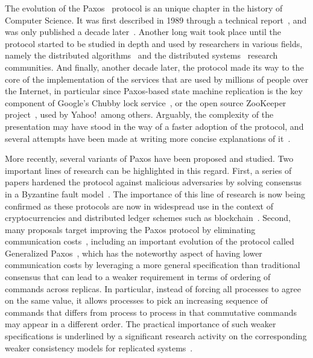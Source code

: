 The evolution of the Paxos~\cite{Lam98} protocol is an unique
chapter in the history of Computer Science. It was first described in
1989 through a technical report~\cite{paxos:tr}, and was only
published a decade later~\cite{Lam98}. Another long wait took
place until the protocol started to be studied in depth and used by
researchers in various fields, namely the distributed
algorithms~\cite{DPLL97} and the distributed systems~\cite{petal}
research communities. And finally, another decade later, the protocol
made its way to the core of the implementation of the services that
are used by millions of people over the Internet, in particular since
Paxos-based state machine replication is the key component of Google's
Chubby lock service~\cite{chubby}, or the open source ZooKeeper
project~\cite{zookeeper}, used by Yahoo!\ among others. Arguably, the
complexity of the presentation may have stood in the way of a faster
adoption of the protocol, and several attempts have been made at
writing more concise explanations of
it~\cite{L01,Renesse2011}.


More recently, several variants of Paxos have been proposed and
studied. Two important lines of research can be highlighted in this
regard. First, a series of papers hardened the protocol against
malicious adversaries by solving consensus in a Byzantine fault
model~\cite{Martin2006,Lamport2011}. The importance of this line of
research is now being confirmed as these protocols are now in widespread
use in the context of cryptocurrencies and distributed ledger
schemes such as blockchain~\cite{bitcoin}.
Second, many proposals target improving
the Paxos protocol by eliminating communication costs~\cite{L06},
including an important evolution of the protocol called Generalized
Paxos~\cite{Lamport2005}, which has the noteworthy aspect of
having lower communication costs by leveraging a more general specification than traditional consensus that can lead to a weaker requirement in terms of ordering of commands across replicas. In particular, instead of forcing all
processes to agree on the same value, it allows processes to pick an
increasing sequence of commands that differs from process to process
in that commutative commands may appear in a different order.
The practical importance of such weaker specifications is underlined
by a significant research activity on the corresponding weaker consistency
models for replicated systems~\cite{LLS90,dynamo}.


